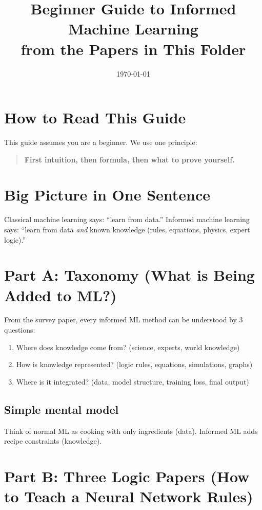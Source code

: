 ﻿\documentclass[11pt,a4paper]{article}
\title{Beginner Guide to Informed Machine Learning\\from the Papers in This Folder}
\author{}
\date{\today}
\begin{document}
\maketitle

\section{How to Read This Guide}
This guide assumes you are a beginner. We use one principle:
\begin{quote}
\textbf{First intuition, then formula, then what to prove yourself.}
\end{quote}

\section{Big Picture in One Sentence}
Classical machine learning says: ``learn from data.''\newline
Informed machine learning says: ``learn from data \emph{and} known knowledge (rules, equations, physics, expert logic).''

\section{Part A: Taxonomy (What is Being Added to ML?)}
From the survey paper, every informed ML method can be understood by 3 questions:
\begin{enumerate}
\item Where does knowledge come from? (science, experts, world knowledge)
\item How is knowledge represented? (logic rules, equations, simulations, graphs)
\item Where is it integrated? (data, model structure, training loss, final output)
\end{enumerate}

\subsection{Simple mental model}
Think of normal ML as cooking with only ingredients (data).\newline
Informed ML adds recipe constraints (knowledge).

\section{Part B: Three Logic Papers (How to Teach a Neural Network Rules)}
\end{document}
